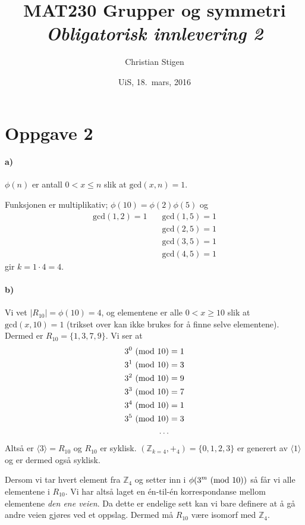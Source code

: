 \documentclass[a4paper,norsk,twocolumn,10pt]{article}
\title{MAT230 Grupper og symmetri\\ \textit{Obligatorisk innlevering 2}}
\author{Christian Stigen}
\date{UiS, 18.~mars, 2016}
\begin{document}
\maketitle

\section*{Oppgave 2}
\paragraph{\textbf{a)}}
$\phi{(n)}$ er antall $0 < x \leqslant n$ slik at $\text{gcd}{(x,n)} = 1$.

Funksjonen er multiplikativ; $\phi{(10)} = \phi{(2)} \phi{(5)}$ og
\begin{align*}
  \text{gcd}(1, 2) = 1 \quad & \text{gcd}(1, 5) = 1 \\
                       & \text{gcd}(2, 5) = 1 \\
                       & \text{gcd}(3, 5) = 1 \\
                       & \text{gcd}(4, 5) = 1
\end{align*}
gir $k = 1\cdot4 =4 $.

\paragraph{\textbf{b)}}
Vi vet $|R_10| = \phi{(10)} = 4$, og elementene er alle $0<x\geqslant 10$ slik
at $\text{gcd}(x,10)=1$ (trikset over kan ikke brukes for å finne selve
elementene). Dermed er $R_{10} = \{ 1,3,7,9 \}$. Vi ser at
\begin{align*}
  3^0 \ (\text{mod}\ 10) &= 1 \\
  3^1 \ (\text{mod}\ 10) &= 3 \\
  3^2 \ (\text{mod}\ 10) &= 9 \\
  3^3 \ (\text{mod}\ 10) &= 7 \\
  3^4 \ (\text{mod}\ 10) &= 1 \\
  3^5 \ (\text{mod}\ 10) &= 3 \\
  \ldots
\end{align*}
Altså er $\langle 3 \rangle = R_{10}$ og $R_{10}$ er syklisk. 
$(\mathbb{Z}_{k=4}, +_4) = \{0,1,2,3\}$ er generert av $\langle 1 \rangle$ og
er dermed også syklisk.

Dersom vi tar hvert element fra $\mathbb{Z}_4$ og setter inn i
$\phi{(3^m\ (\text{mod}\ 10))}$ så får vi alle elementene i $R_{10}$. Vi har altså laget
en én-til-én korrespondanse mellom elementene \textit{den ene veien}. Da dette
er endelige sett kan vi bare definere at å gå andre veien gjøres ved et
oppslag. Dermed må $R_{10}$ være isomorf med $\mathbb{Z}_4$.
\end{document}
